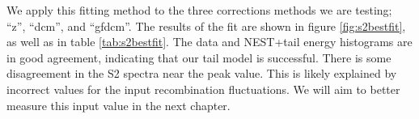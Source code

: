 We apply this fitting method to the three corrections methods we are testing; ``z'', ``dcm'', and ``gfdcm''. The results of the fit are shown in figure \ref{fig:s2bestfit}, as well as in table \ref{tab:s2bestfit}. The data and NEST+tail energy histograms are in good agreement, indicating that our tail model is successful. There is some disagreement in the S2 spectra near the peak value. This is likely explained by incorrect values for the input recombination fluctuations. We will aim to better measure this input value in the next chapter.









